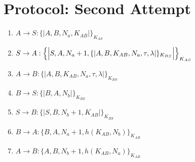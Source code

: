 \section{Protocol: Second Attempt}


\begin{enumerate}
    \item $ A \rightarrow S : \{|A, B, N_a, K_{AB}|\}_{K_{AS}}$
    \item $ S \rightarrow A : \Bigl\{\Bigl|S,A, N_a + 1, \{|A,B,K_{AB},N_a, \tau, \lambda |\}_{K_{BS}}\Bigr|\Bigr\}_{K_{AS}}$
    \item $ A \rightarrow B : \{|A,B,K_{AB},N_a, \tau, \lambda |\}_{K_{BS}}$
    \item $ B \rightarrow S : \{|B, A, N_b|\}_{K_{BS}}$
    \item $ S \rightarrow B : \{|S, B, N_b + 1, K_{AB}|\}_{K_{BS}}$
    \item $ B \rightarrow A : \{B, A, N_a+1, h(K_{AB}, N_b)\}_{K_{AB}}$
    \item $ A \rightarrow B : \{A, B, N_b+1, h(K_{AB}, N_a)\}_{K_{AB}}$

\end{enumerate}